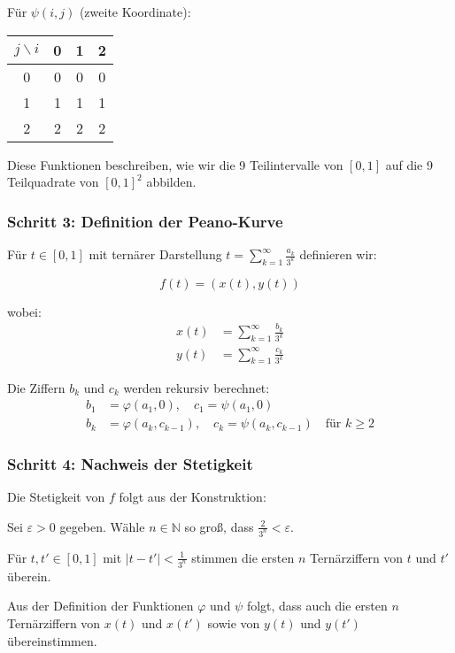 \documentclass{article}
\begin{document}
Für $\psi(i,j)$ (zweite Koordinate):
\begin{center}
\begin{tabular}{c|ccc}
$j \backslash i$ & 0 & 1 & 2 \\
\hline
0 & 0 & 0 & 0 \\
1 & 1 & 1 & 1 \\
2 & 2 & 2 & 2 \\
\end{tabular}
\end{center}

Diese Funktionen beschreiben, wie wir die 9 Teilintervalle von $[0,1]$ auf die 9 Teilquadrate von $[0,1]^2$ abbilden.

\subsubsection*{Schritt 3: Definition der Peano-Kurve}

Für $t \in [0,1]$ mit ternärer Darstellung $t = \sum_{k=1}^{\infty} \frac{a_k}{3^k}$ definieren wir:

$$f(t) = (x(t), y(t))$$

wobei:
\begin{align}
x(t) &= \sum_{k=1}^{\infty} \frac{b_k}{3^k} \\
y(t) &= \sum_{k=1}^{\infty} \frac{c_k}{3^k}
\end{align}

Die Ziffern $b_k$ und $c_k$ werden rekursiv berechnet:
\begin{align}
b_1 &= \varphi(a_1, 0), \quad c_1 = \psi(a_1, 0) \\
b_k &= \varphi(a_k, c_{k-1}), \quad c_k = \psi(a_k, c_{k-1}) \quad \text{für } k \geq 2
\end{align}

\subsubsection*{Schritt 4: Nachweis der Stetigkeit}

Die Stetigkeit von $f$ folgt aus der Konstruktion:

Sei $\varepsilon > 0$ gegeben. Wähle $n \in \mathbb{N}$ so groß, dass $\frac{2}{3^n} < \varepsilon$.

Für $t, t' \in [0,1]$ mit $|t - t'| < \frac{1}{3^n}$ stimmen die ersten $n$ Ternärziffern von $t$ und $t'$ überein. 

Aus der Definition der Funktionen $\varphi$ und $\psi$ folgt, dass auch die ersten $n$ Ternärziffern von $x(t)$ und $x(t')$ sowie von $y(t)$ und $y(t')$ übereinstimmen.
\end{document}
